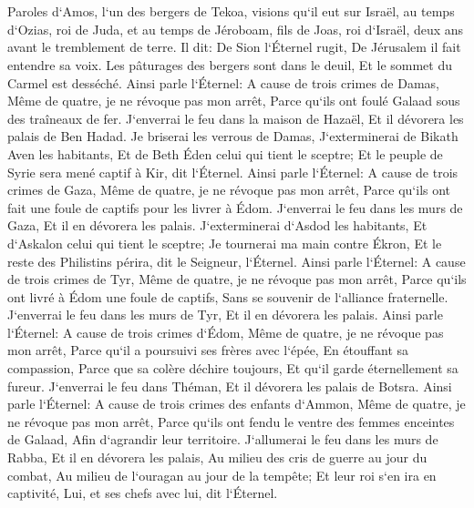 

\chapter{}

\verse Paroles d`Amos, l`un des bergers de Tekoa, visions qu`il eut sur Israël, au temps d`Ozias, roi de Juda, et au temps de Jéroboam, fils de Joas, roi d`Israël, deux ans avant le tremblement de terre. 
\verse Il dit: De Sion l`Éternel rugit, De Jérusalem il fait entendre sa voix. Les pâturages des bergers sont dans le deuil, Et le sommet du Carmel est desséché. 
\verse Ainsi parle l`Éternel: A cause de trois crimes de Damas, Même de quatre, je ne révoque pas mon arrêt, Parce qu`ils ont foulé Galaad sous des traîneaux de fer. 
\verse J`enverrai le feu dans la maison de Hazaël, Et il dévorera les palais de Ben Hadad. 
\verse Je briserai les verrous de Damas, J`exterminerai de Bikath Aven les habitants, Et de Beth Éden celui qui tient le sceptre; Et le peuple de Syrie sera mené captif à Kir, dit l`Éternel. 
\verse Ainsi parle l`Éternel: A cause de trois crimes de Gaza, Même de quatre, je ne révoque pas mon arrêt, Parce qu`ils ont fait une foule de captifs pour les livrer à Édom. 
\verse J`enverrai le feu dans les murs de Gaza, Et il en dévorera les palais. 
\verse J`exterminerai d`Asdod les habitants, Et d`Askalon celui qui tient le sceptre; Je tournerai ma main contre Ékron, Et le reste des Philistins périra, dit le Seigneur, l`Éternel. 
\verse Ainsi parle l`Éternel: A cause de trois crimes de Tyr, Même de quatre, je ne révoque pas mon arrêt, Parce qu`ils ont livré à Édom une foule de captifs, Sans se souvenir de l`alliance fraternelle. 
\verse J`enverrai le feu dans les murs de Tyr, Et il en dévorera les palais. 
\verse Ainsi parle l`Éternel: A cause de trois crimes d`Édom, Même de quatre, je ne révoque pas mon arrêt, Parce qu`il a poursuivi ses frères avec l`épée, En étouffant sa compassion, Parce que sa colère déchire toujours, Et qu`il garde éternellement sa fureur. 
\verse J`enverrai le feu dans Théman, Et il dévorera les palais de Botsra. 
\verse Ainsi parle l`Éternel: A cause de trois crimes des enfants d`Ammon, Même de quatre, je ne révoque pas mon arrêt, Parce qu`ils ont fendu le ventre des femmes enceintes de Galaad, Afin d`agrandir leur territoire. 
\verse J`allumerai le feu dans les murs de Rabba, Et il en dévorera les palais, Au milieu des cris de guerre au jour du combat, Au milieu de l`ouragan au jour de la tempête; 
\verse Et leur roi s`en ira en captivité, Lui, et ses chefs avec lui, dit l`Éternel. 

